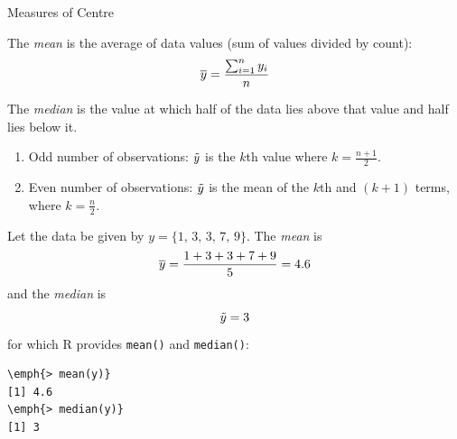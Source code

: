 \documentclass[xcolor=svgnames, 10pt]{beamer}
\begin{document}
\begin{frame}[fragile]{Measures of Centre}
\begin{definition}[Mean]
The \emph{mean} is the average of data values (sum of values divided by count):
$$
\overline{y} = \frac{\sum_{i=1}^n y_i}{n}
$$
\end{definition}

\begin{definition}[Median]
The \emph{median} is the value at which half of the data lies above that value and half lies below it.
\begin{enumerate}
\item Odd number of observations: $\tilde{y}$ is the $k$th value where $k = \frac{n+1}2$.
\item Even number of observations: $\tilde{y}$ is the mean of the $k$th and $(k+1)$ terms, where $k = \frac n 2$.
\end{enumerate}
\end{definition}
\end{frame}


\begin{frame}[fragile]
\begin{example}
Let the data be given by $y = \{1,\, 3,\, 3,\, 7,\, 9 \}$.  The \emph{mean} is
$$\overline{y} = \frac{1 + 3 + 3 + 7 + 9}{5} = 4.6$$
and the \emph{median} is
$$\tilde{y} = 3$$
for which R provides \texttt{mean()} and \texttt{median()}:
\begin{Verbatim}[commandchars=\\\{\}, xleftmargin=2em]
\emph{> mean(y)}
[1] 4.6
\emph{> median(y)}
[1] 3
\end{Verbatim}
\end{example}
\end{frame}
\end{document}
